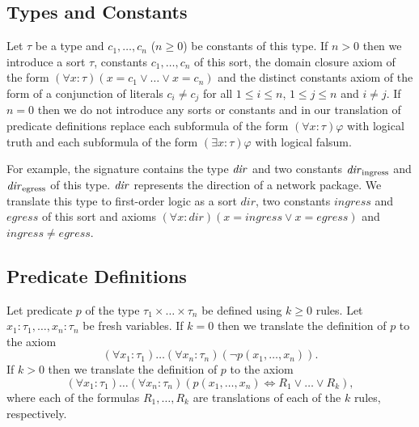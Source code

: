 \subsection{Types and Constants}\label{sect:aws/fol/types}
Let $\tau$ be a type and $c_1,\ldots,c_n$ ($n\ge0$) be constants of this type. If $n>0$ then we introduce a sort $\tau$, constants $c_1,\ldots,c_n$ of this sort, the domain closure axiom of the form $(\forall x:\tau)(x=c_1 \vee\ldots\vee x=c_n)$ and the distinct constants axiom of the form of a conjunction of literals $c_i\not=c_j$ for all $1\le i\le n$, $1\le j\le n$ and $i\not=j$. If $n=0$ then we do not introduce any sorts or constants and in our translation of predicate definitions replace each subformula of the form $(\forall x:\tau)\varphi$ with logical truth and each subformula of the form $(\exists x:\tau)\varphi$ with logical falsum.

For example, the signature contains the type $\mathit{dir}$ and two constants $\mathit{dir}_\text{ingress}$ and $\mathit{dir}_\text{egress}$ of this type. $\mathit{dir}$ represents the direction of a network package. We translate this type to first-order logic as a sort $\mathit{dir}$, two constants $\mathit{ingress}$ and $\mathit{egress}$ of this sort and axioms $(\forall x:\mathit{dir})(x=\mathit{ingress}\vee x=\mathit{egress})$ and $\mathit{ingress}\neq\mathit{egress}$.


\subsection{Predicate Definitions}\label{sect:aws/fol/predicates}

Let predicate $p$ of the type $\tau_1\times\ldots\times\tau_n$ be defined using $k\ge0$ rules. Let $x_1:\tau_1,\ldots,x_n:\tau_n$ be fresh variables. If $k=0$ then we translate the definition of $p$ to the axiom $$(\forall x_1:\tau_1)\ldots(\forall x_n:\tau_n)(\neg p(x_1,\ldots,x_n)).$$ If $k>0$ then we translate the definition of $p$ to the axiom $$(\forall x_1:\tau_1)\ldots(\forall x_n:\tau_n)(p(x_1,\ldots,x_n)\Leftrightarrow R_1\vee\ldots\vee R_k),$$ where each of the formulas $R_1,\ldots,R_k$ are translations of each of the $k$ rules, respectively.

